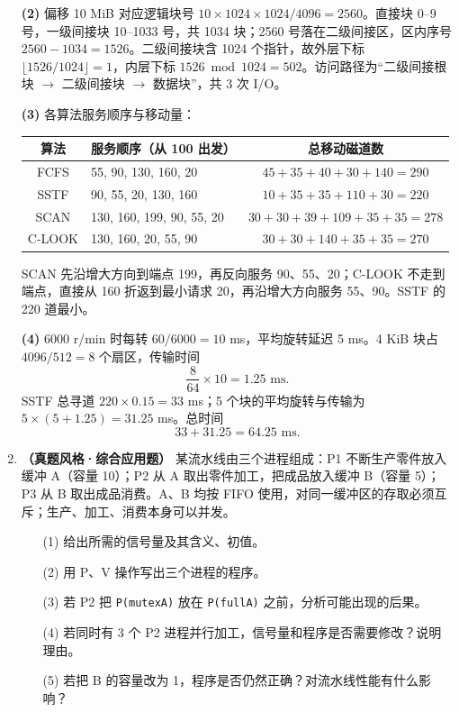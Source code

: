 \begin{enumerate}[resume]
\textbf{(2)} 偏移 10 MiB 对应逻辑块号 $10\times1024\times1024/4096=2560$。直接块 0--9 号，一级间接块 10--1033 号，共 1034 块；2560 号落在二级间接区，区内序号 $2560-1034=1526$。二级间接块含 1024 个指针，故外层下标 $\lfloor1526/1024\rfloor=1$，内层下标 $1526\bmod1024=502$。访问路径为“二级间接根块 $\to$ 二级间接块 $\to$ 数据块”，共 3 次 I/O。

\textbf{(3)} 各算法服务顺序与移动量：
\begin{center}
\small
\begin{tabular}{|c|l|c|}
\hline
算法 & 服务顺序（从 100 出发） & 总移动磁道数 \\
\hline
FCFS & 55, 90, 130, 160, 20 & $45+35+40+30+140=290$ \\
SSTF & 90, 55, 20, 130, 160 & $10+35+35+110+30=220$ \\
SCAN & 130, 160, 199, 90, 55, 20 & $30+30+39+109+35+35=278$ \\
C-LOOK & 130, 160, 20, 55, 90 & $30+30+140+35+35=270$ \\
\hline
\end{tabular}
\end{center}
SCAN 先沿增大方向到端点 199，再反向服务 90、55、20；C-LOOK 不走到端点，直接从 160 折返到最小请求 20，再沿增大方向服务 55、90。SSTF 的 220 道最小。

\textbf{(4)} 6000 r/min 时每转 $60/6000=10$ ms，平均旋转延迟 5 ms。4 KiB 块占 $4096/512=8$ 个扇区，传输时间
\[
\frac{8}{64}\times10=1.25\text{ ms}.
\]
SSTF 总寻道 $220\times0.15=33$ ms；5 个块的平均旋转与传输为 $5\times(5+1.25)=31.25$ ms。总时间
\[
33+31.25=64.25\text{ ms}.
\]
\par\noindent{}\else \answerarea[16] \fi

\item \textbf{（真题风格·综合应用题）} 某流水线由三个进程组成：P1 不断生产零件放入缓冲 A（容量 10）；P2 从 A 取出零件加工，把成品放入缓冲 B（容量 5）；P3 从 B 取出成品消费。A、B 均按 FIFO 使用，对同一缓冲区的存取必须互斥；生产、加工、消费本身可以并发。
\begin{enumerate}
\item[(1)] 给出所需的信号量及其含义、初值。
\item[(2)] 用 P、V 操作写出三个进程的程序。
\item[(3)] 若 P2 把 \texttt{P(mutexA)} 放在 \texttt{P(fullA)} 之前，分析可能出现的后果。
\item[(4)] 若同时有 3 个 P2 进程并行加工，信号量和程序是否需要修改？说明理由。
\item[(5)] 若把 B 的容量改为 1，程序是否仍然正确？对流水线性能有什么影响？
\end{enumerate}


\end{enumerate}

